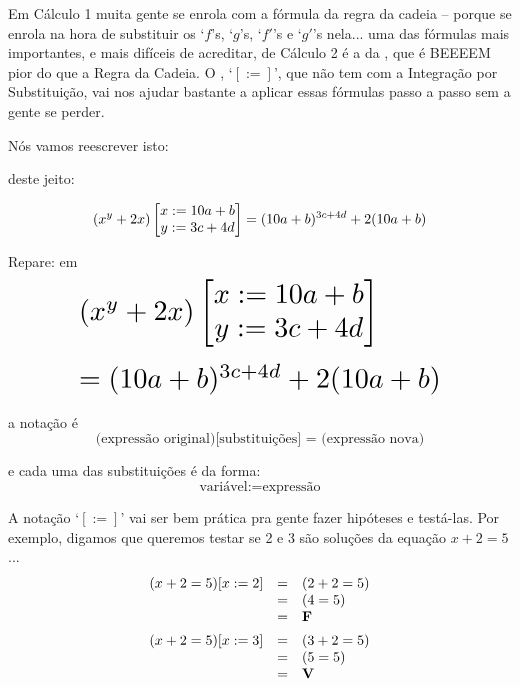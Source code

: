 \documentclass[oneside,12pt]{article}
\begin{document}
Em Cálculo 1 muita gente se enrola com a fórmula da regra da cadeia --
porque se enrola na hora de substituir os `$f$'s, `$g$'s, `$f'$'s e
`$g'$'s nela... uma das fórmulas mais importantes, e mais difíceis de
acreditar, de Cálculo 2 é a da ,
que é BEEEEM pior do que a Regra da Cadeia. O , `$[:=]$', que não tem  com a
Integração por Substituição, vai nos ajudar bastante a aplicar essas
fórmulas passo a passo sem a gente se perder.

\newpage


Nós vamos reescrever isto:

\msk

\begin{center}
\end{center}

\msk

deste jeito:

$$(x^y+2x) \left [\begin{matrix}x:=10a+b \\ y:=3c+4d\end{matrix}\right ] = (10a+b)^{3c+4d} + 2(10a+b)$$

\newpage


Repare: em
%
$$\scalebox{2.0}{$
  \begin{array}{l}
  (x^y+2x) \bmat{x:=10a+b \\ y:=3c+4d} \\[12pt]
  = (10a+b)^{3c+4d} + 2(10a+b)
  \end{array}
  $}
$$

a notação é
%
$$\text{(expressão original)[substituições] = (expressão nova)}$$

e cada uma das substituições é da forma:
%
$$\text{variável} := \text{expressão}$$


\newpage


A notação `$[:=]$' vai ser bem prática pra gente fazer hipóteses e
testá-las. Por exemplo, digamos que queremos testar se 2 e 3 são
soluções da equação $x+2=5$...
%
$$\begin{array}{rcl}
  (x+2=5)[x:=2] &=& (2+2=5) \\
                &=& (4=5) \\
                &=& \mathbf{F} \\[5pt]
  (x+2=5)[x:=3] &=& (3+2=5) \\
                &=& (5=5) \\
                &=& \mathbf{V} \\[5pt]
  \end{array}
$$
\end{document}
